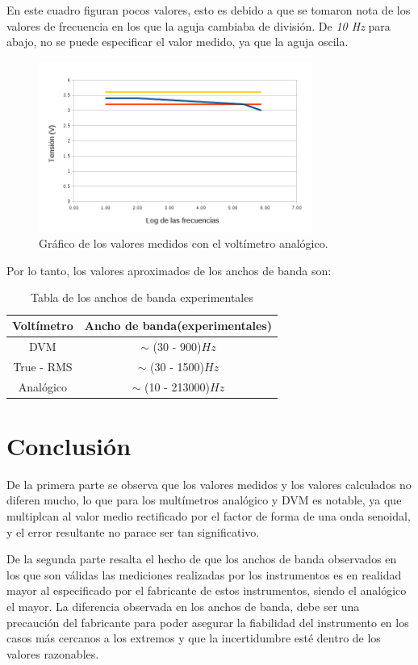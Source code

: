 \documentclass{article}
\begin{document}
	En este cuadro figuran pocos valores, esto es debido a que se tomaron nota de los valores de frecuencia en los que la aguja cambiaba de división. De \textit{10 Hz} para abajo, no se puede especificar el valor medido, ya que la aguja oscila.


\newpage
\begin{figure}[h]
	\centering
	\includegraphics[width=0.80\textwidth]{images/tablaANA.png}
	\caption{Gráfico de los valores medidos con el voltímetro analógico.}
\end{figure}
\bigskip\bigskip



Por lo tanto, los valores aproximados de los anchos de banda son:

\begin{table}[!hbt]
	\begin{center}
	\begin{tabular}{|c|c|}\hline
	\textbf{Voltímetro} & \textbf{Ancho de banda(experimentales)}\\ \hline
    DVM &  $\sim$ (30 - 900)$Hz$\\ \hline
    True - RMS &  $\sim$ (30 - 1500)$Hz$\\ \hline
    Analógico & $\sim$ (10 - 213000)$Hz$\\ \hline
	\end{tabular}
	\caption{Tabla de los anchos de banda experimentales}
	\end{center}
\end{table}
\bigskip




\section{Conclusión}

	De la primera parte se observa que los valores medidos y los valores calculados no diferen mucho, lo que para los multímetros analógico y DVM es notable, ya que multiplcan al valor medio rectificado por el factor de forma de una onda senoidal, y el error resultante no parace ser tan significativo.
	\par
	De la segunda parte resalta el hecho de que los anchos de banda observados en los que son válidas las mediciones realizadas por los instrumentos es en realidad mayor al especificado por el fabricante de estos instrumentos, siendo el analógico el mayor. La diferencia observada en los anchos de banda, debe ser una precaución del fabricante para poder asegurar la fiabilidad del instrumento en los casos más cercanos a los extremos y que la incertidumbre esté dentro de los valores razonables.
\end{document}
